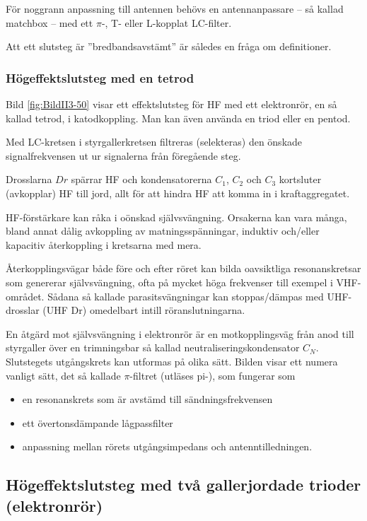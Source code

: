 För noggrann anpassning till antennen behövs en antennanpassare --
så kallad matchbox -- med ett \(\pi \)-, T- eller L-kopplat LC-filter.

Att ett slutsteg är ''bredbandsavstämt'' är således en fråga om definitioner.

\subsubsection{Högeffektslutsteg med en tetrod}


Bild \ref{fig:BildII3-50} visar ett effektslutsteg för HF med ett elektronrör,
en så kallad tetrod, i katodkoppling.
Man kan även använda en triod eller en pentod.

Med LC-kretsen i styrgallerkretsen filtreras (selekteras) den önskade
signalfrekvensen ut ur signalerna från föregående steg.

Drosslarna \(Dr\) spärrar HF och kondensatorerna \(C_1\), \(C_2\) och
\(C_3\) kortsluter (avkopplar) HF till jord,
allt för att hindra HF att komma in i kraftaggregatet.

HF-förstärkare kan råka i oönskad självsvängning.
Orsakerna kan vara många, bland annat dålig avkoppling av matningsspänningar,
induktiv och/eller kapacitiv återkoppling i kretsarna med mera.

Återkopplingsvägar både före och efter röret kan bilda oavsiktliga
resonanskretsar som genererar självsvängning, ofta på mycket höga
frekvenser till exempel i VHF-området.
Sådana så kallade parasitsvängningar kan stoppas/dämpas med UHF-drosslar (UHF
Dr) omedelbart intill röranslutningarna.

En åtgärd mot självsvängning i elektronrör är en motkopplingsväg från anod till
styrgaller över en trimningsbar så kallad neutraliseringskondensator \(C_N\).
Slutstegets utgångskrets kan utformas på olika sätt.
Bilden visar ett numera vanligt sätt, det så kallade \(\pi\)-filtret (utläses
pi-), som fungerar som
\begin{itemize}
  \item en resonanskrets som är avstämd till sändningsfrekvensen
  \item ett övertonsdämpande lågpassfilter
  \item anpassning mellan rörets utgångsimpedans och antenntilledningen.
\end{itemize}

\subsection{Högeffektslutsteg med två gallerjordade trioder (elektronrör)}

